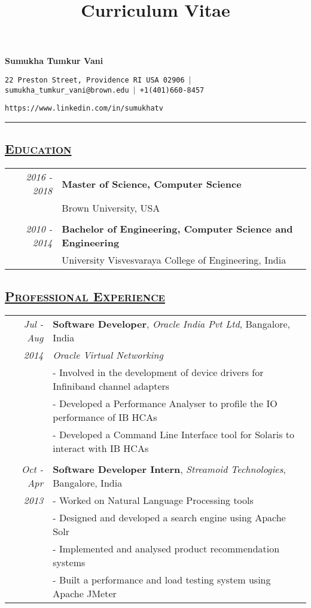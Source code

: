 \documentclass[14pt]{article}
\newenvironment{nscenter}
 {\parskip=0pt\par\nopagebreak\centering}
 {\par\noindent\ignorespacesafterend}
\begin{document}
\title{Curriculum Vitae}


\centerline{\huge{\textbf{Sumukha Tumkur Vani}}}

\centerline{\small{\texttt{22 Preston Street, Providence RI USA 02906 $|$ sumukha\_tumkur\_vani@brown.edu $|$ +1(401)660-8457}}}
\centerline{\small{\texttt{https://www.linkedin.com/in/sumukhatv}}}
\begin{nscenter}
\rule{\textwidth}{0.2pt}
\end{nscenter}

\subsection* {\scshape\large\uline {Education}}
\begin{tabularx}{\textwidth}{r X}
\emph{2016 - 2018} & \textbf{Master of Science, Computer Science} \\
		   & Brown University, USA\\
\\
\emph{2010 - 2014} & \textbf{Bachelor of Engineering, Computer Science and Engineering} \\
		   & University Visvesvaraya College of Engineering, India\\
\end{tabularx}


\subsection* {\scshape\large\uline {Professional Experience}}

\begin{tabularx}{\textwidth}{r X}
\emph{Jul - Aug} & \textbf{Software Developer}, \textit{Oracle India Pvt Ltd}, Bangalore, India \\
\emph{2014  \enskip 2016}                & \emph{Oracle Virtual Networking}\\ 
			                 & - Involved in the development of device drivers for Infiniband channel adapters\\
			                 & - Developed a Performance Analyser to profile the IO performance of IB HCAs\\
			                 & - Developed a Command Line Interface tool for Solaris to interact with IB HCAs
\\\\
\emph{Oct - Apr} & \textbf{Software Developer Intern}, \textit{Streamoid Technologies}, Bangalore, India \\ 
\emph{2013 \enskip 2014}            & - Worked on Natural Language Processing tools \\
		 	            	& - Designed and developed a search engine using Apache Solr \\
   			           	& - Implemented and analysed product recommendation systems \\
			           	& - Built a performance and load testing system using Apache JMeter
\end{tabularx}
\end{document}
